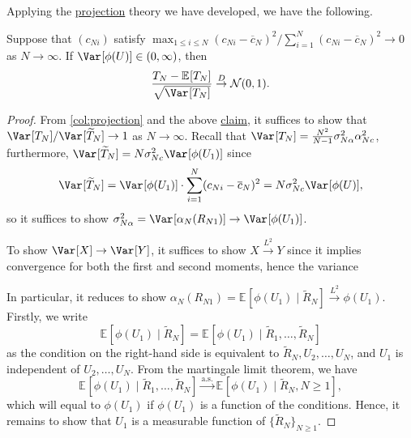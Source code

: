 Applying the \hyperref[def:projection]{projection} theory we have developed, we have the following.

\begin{theorem}\label{thm:simple-linear-rank-statistic}
	Suppose that \((c_{Ni})\) satisfy \(\max _{1 \leq i \leq N} (c_{Ni} - \overline{c} _N)^2 / \sum_{i=1}^{N} (c_{Ni} - \overline{c} _N)^2 \to 0\) as \(N \to \infty \). If \(\Var_{}[\phi (U)] \in (0, \infty )\), then
	\[
		\frac{T_N - \mathbb{E}_{}[T_N] }{\sqrt{\Var_{}[T_N] } }
		\overset{D}{\to} \mathcal{N} (0, 1).
	\]
\end{theorem}
\begin{proof}
	From \autoref{col:projection} and the above \hyperref[clm:simple-linear-rank-statistic-asymptotic-normality]{claim}, it suffices to show that \(\Var_{}[T_N] / \Var_{}[\widetilde{T} _N] \to 1\) as \(N \to \infty \). Recall that \(\Var_{}[T_N] = \frac{N^2}{N-1} \sigma _{N \alpha }^2 \alpha _{Nc}^2\), furthermore, \(\Var_{}[\widetilde{T} _N] = N \sigma _{Nc}^2 \Var_{}[\phi (U_1)] \) since
	\[
		\Var_{}[\widetilde{T} _N]
		= \Var_{}[\phi (U_1)] \cdot \sum_{i=1}^{N} (c_{Ni} - \overline{c} _N)^2
		= N \sigma _{Nc}^2 \Var_{}[\phi (U)] ,
	\]
	so it suffices to show \(\sigma _{N \alpha }^2 = \Var_{}[\alpha _N(R_{N1})] \to \Var_{}[\phi (U_1)] \).

	\begin{note}
		To show \(\Var_{}[X] \to \Var_{}[Y] \), it suffices to show \(X \overset{L^2}{\to} Y \) since it implies convergence for both the first and second moments, hence the variance
	\end{note}

	In particular, it reduces to show \(\alpha _N(R_{N1}) = \mathbb{E}_{}[\phi (U_1) \mid \widetilde{R} _N] \overset{L^2}{\to} \phi (U_1)\). Firstly, we write
	\[
		\mathbb{E}_{}[\phi (U_1) \mid \widetilde{R} _N]
		= \mathbb{E}_{}[\phi (U_1) \mid \widetilde{R} _1, \dots , \widetilde{R} _N]
	\]
	as the condition on the right-hand side is equivalent to \(\widetilde{R} _N, U_2, \dots , U_N\), and \(U_1\) is independent of \(U_2, \dots , U_N\). From the martingale limit theorem, we have
	\[
		\mathbb{E}_{}[\phi (U_1) \mid \widetilde{R} _1, \dots , \widetilde{R} _N]
		\overset{\text{a.s.}}{\to} \mathbb{E}_{}[\phi (U_1) \mid \widetilde{R} _N, N \geq 1] ,
	\]
	which will equal to \(\phi (U_1)\) if \(\phi (U_1)\) is a function of the conditions. Hence, it remains to show that \(U_1\) is a measurable function of \(\{ \widetilde{R} _N \}_{N \geq 1}\).


\end{proof}
